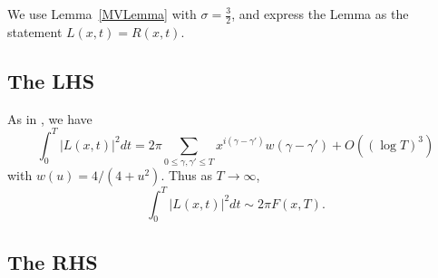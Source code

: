 \documentclass[12pt]{amsart}
\begin{document}
We use Lemma~\ref{MVLemma} with $\sigma=\frac 32$, and express the Lemma as the statement $L(x,t) = R(x,t)$. 

\subsection{The LHS}
As in \cite{MontgomeryPC}, we have %
\[
\int_0^T |L(x,t)|^2 dt  = 2\pi  \sum_{0\leq \gamma,\gamma'\leq T} x^{i(\gamma-\gamma')} w(\gamma-\gamma') + O\left( \left( \log T \right)^3 \right) 
\]
with $w(u) = 4/(4+u^2)$. 
Thus as $T\to \infty$, 
\begin{equation}\label{eq:LHS}
\int_0^T |L(x,t)|^2 dt  \sim  2\pi F(x,T).
\end{equation}

\subsection{The RHS}
\end{document}
